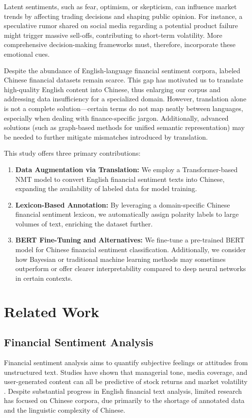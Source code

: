 \documentclass[12pt]{article}
\begin{document}
Latent sentiments, such as fear, optimism, or skepticism, can influence market trends by affecting trading decisions and shaping public opinion. For instance, a speculative rumor shared on social media regarding a potential product failure might trigger massive sell-offs, contributing to short-term volatility. More comprehensive decision-making frameworks must, therefore, incorporate these emotional cues.

Despite the abundance of English-language financial sentiment corpora, labeled Chinese financial datasets remain scarce. This gap has motivated us to translate high-quality English content into Chinese, thus enlarging our corpus and addressing data insufficiency for a specialized domain. However, translation alone is not a complete solution---certain terms do not map neatly between languages, especially when dealing with finance-specific jargon. Additionally, advanced solutions (such as graph-based methods for unified semantic representation) may be needed to further mitigate mismatches introduced by translation.

This study offers three primary contributions:

\begin{enumerate}
    \item \textbf{Data Augmentation via Translation:} We employ a Transformer-based NMT model to convert English financial sentiment texts into Chinese, expanding the availability of labeled data for model training.
    \item \textbf{Lexicon-Based Annotation:} By leveraging a domain-specific Chinese financial sentiment lexicon, we automatically assign polarity labels to large volumes of text, enriching the dataset further.
    \item \textbf{BERT Fine-Tuning and Alternatives:} We fine-tune a pre-trained BERT model for Chinese financial sentiment classification. Additionally, we consider how Bayesian or traditional machine learning methods may sometimes outperform or offer clearer interpretability compared to deep neural networks in certain contexts.
\end{enumerate}

\section{Related Work}
\label{sec:relatedwork}

\subsection{Financial Sentiment Analysis}
Financial sentiment analysis aims to quantify subjective feelings or attitudes from unstructured text. Studies have shown that managerial tone, media coverage, and user-generated content can all be predictive of stock returns and market volatility \cite{ref3,ref4}. Despite substantial progress in English financial text analysis, limited research has focused on Chinese corpora, due primarily to the shortage of annotated data and the linguistic complexity of Chinese.
\end{document}
